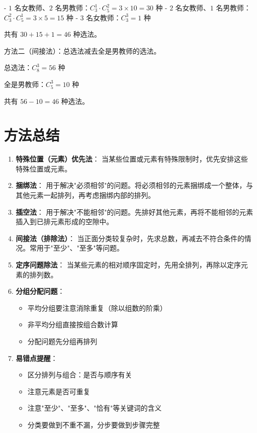 \documentclass[11pt]{ctexrep}
\begin{document}
- $1$ 名女教师、$2$ 名男教师：$C_3^1 \cdot C_5^2 = 3 \times 10 = 30$ 种
- $2$ 名女教师、$1$ 名男教师：$C_3^2 \cdot C_5^1 = 3 \times 5 = 15$ 种
- $3$ 名女教师：$C_3^3 = 1$ 种

共有 $30 + 15 + 1 = 46$ 种选法。

方法二（间接法）：总选法减去全是男教师的选法。

总选法：$C_8^3 = 56$ 种

全是男教师：$C_5^3 = 10$ 种

共有 $56 - 10 = 46$ 种选法。

\section*{方法总结}

\begin{enumerate}
    \item \textbf{特殊位置（元素）优先法}：
    当某些位置或元素有特殊限制时，优先安排这些特殊位置或元素。
    
    \item \textbf{捆绑法}：
    用于解决"必须相邻"的问题。将必须相邻的元素捆绑成一个整体，与其他元素一起排列，再考虑捆绑内部的排列。
    
    \item \textbf{插空法}：
    用于解决"不能相邻"的问题。先排好其他元素，再将不能相邻的元素插入到已排元素形成的空隙中。
    
    \item \textbf{间接法（排除法）}：
    当正面分类较复杂时，先求总数，再减去不符合条件的情况。常用于"至少"、"至多"等问题。
    
    \item \textbf{定序问题除法}：
    当某些元素的相对顺序固定时，先用全排列，再除以定序元素的排列数。
    
    \item \textbf{分组分配问题}：
    \begin{itemize}
        \item 平均分组要注意消除重复（除以组数的阶乘）
        \item 非平均分组直接按组合数计算
        \item 分配问题先分组再排列
    \end{itemize}
    
    \item \textbf{易错点提醒}：
    \begin{itemize}
        \item 区分排列与组合：是否与顺序有关
        \item 注意元素是否可重复
        \item 注意"至少"、"至多"、"恰有"等关键词的含义
        \item 分类要做到不重不漏，分步要做到步骤完整
    \end{itemize}
\end{enumerate}
\end{document}
